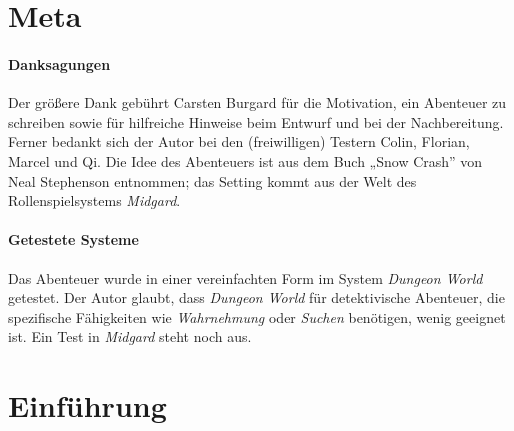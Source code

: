 \documentclass[a4paper,10pt]{scrartcl}
\title{\drugname}
\author{Dimitri Scheftelowitsch}
\begin{document}
\maketitle

\begin{center}
  \midgardabenteuer{}
\end{center}

\begin{abstract} Dies ist ein stark an „Snow Crash” angelehntes
  Abenteuer. Der Autor bedankt sich bei Neal Stephenson für die Idee,
  für den einen oder anderen Charakter und bei Carsten Burgard für den
  Vorschlag, sich aus Büchern zu bedienen. Das Abenteuer kann ohne
  Verwendung eines bestimmten Regelwerks verwendet werden, impliziert
  aber eine Midgard-basierte Welt und nutzt Midgard-spezifische
  Begriffe, insbesondere, was NPCs angeht. Auch die Werte der NPCs sind
  für Midgard angegeben; falls man in einem anderen System spielt,
  sollte man sie entsprechend anpassen.
\end{abstract}

\section{Meta}

\paragraph{Danksagungen}

Der größere Dank gebührt Carsten Burgard für die Motivation, ein
Abenteuer zu schreiben sowie für hilfreiche Hinweise beim Entwurf und
bei der Nachbereitung. Ferner bedankt sich der Autor bei den
(freiwilligen) Testern Colin, Florian, Marcel und Qi. Die Idee des
Abenteuers ist aus dem Buch „Snow Crash” von Neal Stephenson
entnommen; das Setting kommt aus der Welt des Rollenspielsystems
\emph{Midgard}.

\paragraph{Getestete Systeme}
Das Abenteuer wurde in einer vereinfachten Form im System \emph{Dungeon
World} getestet. Der Autor glaubt, dass \emph{Dungeon World} für
detektivische Abenteuer, die spezifische Fähigkeiten wie
\emph{Wahrnehmung} oder \emph{Suchen} benötigen, wenig geeignet ist. Ein
Test in \emph{Midgard} steht noch aus.

\section{Einführung}
\end{document}

